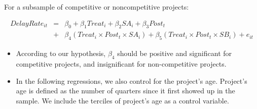 \documentclass[]{article}
\begin{document}
For a subsample of competitive or noncompetitive projects:

\[ \begin{aligned} DelayRate_{it} &=& \beta_0 +\beta_1 Treat_i+ \beta_2 SA_i+ \beta_3 Post_t \\&+& \beta_4 (Treat_i \times Post_t \times SA_i )+\beta_5 (Treat_i \times Post_t \times SB_i )+e_{it} \end{aligned} \]

\begin{itemize}
\item
  According to our hypothesis, \(\beta_4\) should be positive and
  significant for competitive projects, and insignificant for
  non-competitive projects.
\item
  In the following regressions, we also control for the project's age.
  Project's age is defined as the number of quarters since it first
  showed up in the sample. We include the terciles of project's age as a
  control variable.
\end{itemize}
\end{document}
